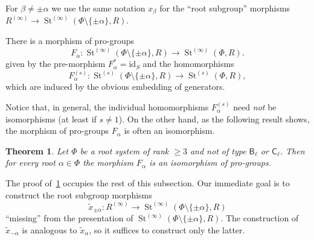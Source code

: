 \documentclass{article}
\numberwithin{equation}{section}
\newtheorem{theorem}{Theorem}
\theoremstyle{definition}
\theoremstyle{remark}
\DeclareMathOperator\St{St}
\DeclareMathOperator{\Pro}{Pro}
\newcommand{\Set}{\mathbf{Set}}
\newcommand{\rB}{\mathsf{B}}
\newcommand{\rC}{\mathsf{C}}
\begin{document}
For $\beta \neq \pm\alpha$ we use the same notation $x_\beta$ for the ``root subgroup'' morphisms $R^{(\infty)}\to \St^{(\infty)}(\Phi \setminus\{\pm\alpha\}, R)$.

There is a morphism of pro-groups
\[ F_\alpha \colon \St^{(\infty)}(\Phi \setminus\{\pm\alpha\}, R) \to \St^{(\infty)}(\Phi, R). \]
given by the pre-morphism $F_\alpha^{*} = \mathrm{id}_S$ and the homomorphisms \[F_\alpha^{(s)} \colon \St^{(s)}(\Phi \setminus\{\pm\alpha\}, R) \to \St^{(s)}(\Phi, R),\] which are induced by the obvious embedding of generators.

Notice that, in general, the individual homomorphisms $F_\alpha^{(s)}$ need {\it not} be isomorphisms (at least if $s \neq 1$). On the other hand, as the following result shows, the morphism of pro-groups $F_\alpha$ is often an isomorphism. 
\begin{theorem}\label{SingleRootElimination}
 Let \(\Phi\) be a root system of rank \(\geq 3\) and not of type \(\rB_\ell\) or \(\rC_\ell\). Then for every root \(\alpha \in \Phi\) the morphism $F_\alpha$ is an isomorphism of pro-groups.
\end{theorem}
The proof of~\cref{SingleRootElimination} occupies the rest of this subsection.
Our immediate goal is to construct the root subgroup morphisms
\[\widetilde x_{\pm \alpha} \colon R^{(\infty)} \to \St^{(\infty)}(\Phi \setminus \{\pm \alpha\}, R) \] ``missing'' from the presentation of $\St^{(\infty)}(\Phi\setminus\{\pm\alpha\}, R)$. The construction of $\widetilde{x}_{-\alpha}$ is analogous to $\widetilde{x}_\alpha$, so it suffices to construct only the latter.

\end{document}
